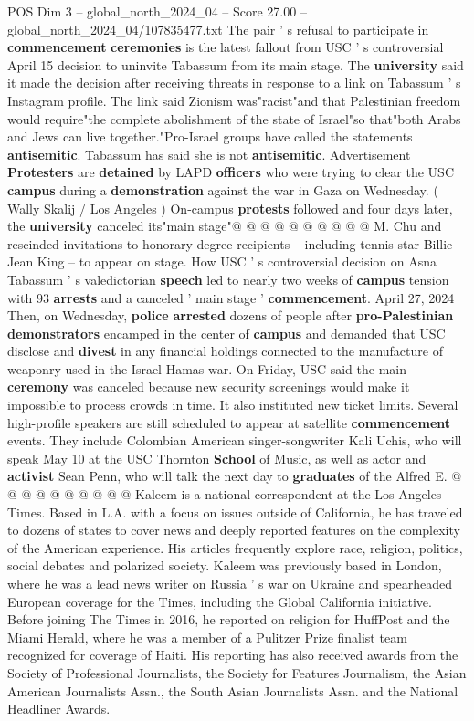 \begin{textsample}{POS Dim 3 – global\_north\_2024\_04 – Score 27.00 – global\_north\_2024\_04/107835477.txt}
The pair ' s refusal to participate in \textbf{commencement} \textbf{ceremonies} is the latest fallout from USC ' s controversial April 15 decision to uninvite Tabassum from its main stage.
The \textbf{university} said it made the decision after receiving threats in response to a link on Tabassum ' s Instagram profile.
The link said Zionism was"racist"and that Palestinian freedom would require"the complete abolishment of the state of Israel"so that"both Arabs and Jews can live together."Pro-Israel groups have called the statements \textbf{antisemitic}.
Tabassum has said she is not \textbf{antisemitic}.
Advertisement \textbf{Protesters} are \textbf{detained} by LAPD \textbf{officers} who were trying to clear the USC \textbf{campus} during a \textbf{demonstration} against the war in Gaza on Wednesday. ( Wally Skalij / Los Angeles ) On-campus \textbf{protests} followed and four days later, the \textbf{university} canceled its"main stage"@ @ @ @ @ @ @ @ @ @ M.
Chu and rescinded invitations to honorary degree recipients -- including tennis star Billie Jean King -- to appear on stage.
How USC ' s controversial decision on Asna Tabassum ' s valedictorian \textbf{speech} led to nearly two weeks of \textbf{campus} tension with 93 \textbf{arrests} and a canceled ' main stage ' \textbf{commencement}.
April 27, 2024 Then, on Wednesday, \textbf{police} \textbf{arrested} dozens of people after \textbf{pro-Palestinian} \textbf{demonstrators} encamped in the center of \textbf{campus} and demanded that USC disclose and \textbf{divest} in any financial holdings connected to the manufacture of weaponry used in the Israel-Hamas war.
On Friday, USC said the main \textbf{ceremony} was canceled because new security screenings would make it impossible to process crowds in time.
It also instituted new ticket limits.
Several high-profile speakers are still scheduled to appear at satellite \textbf{commencement} events.
They include Colombian American singer-songwriter Kali Uchis, who will speak May 10 at the USC Thornton \textbf{School} of Music, as well as actor and \textbf{activist} Sean Penn, who will talk the next day to \textbf{graduates} of the Alfred E. @ @ @ @ @ @ @ @ @ @ Kaleem is a national correspondent at the Los Angeles Times.
Based in L.A. with a focus on issues outside of California, he has traveled to dozens of states to cover news and deeply reported features on the complexity of the American experience.
His articles frequently explore race, religion, politics, social debates and polarized society.
Kaleem was previously based in London, where he was a lead news writer on Russia ' s war on Ukraine and spearheaded European coverage for the Times, including the Global California initiative.
Before joining The Times in 2016, he reported on religion for HuffPost and the Miami Herald, where he was a member of a Pulitzer Prize finalist team recognized for coverage of Haiti.
His reporting has also received awards from the Society of Professional Journalists, the Society for Features Journalism, the Asian American Journalists Assn., the South Asian Journalists Assn. and the National Headliner Awards.


\end{textsample}
